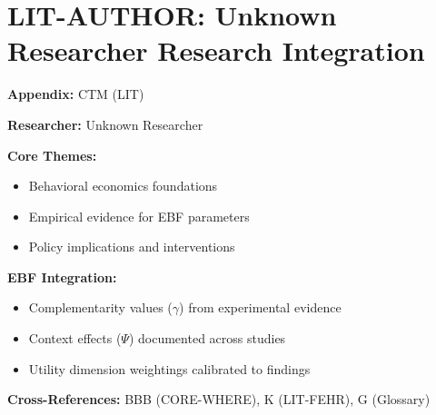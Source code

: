 %
%

\chapter{LIT-AUTHOR: Unknown Researcher Research Integration}
\label{app:ctm}

\begin{abstract}
This appendix integrates the research contributions of Unknown Researcher into the
Evidence-Based Framework. It documents key papers, core findings, and their
integration with EBF dimensions including complementarity parameters ($\gamma$),
context factors ($\Psi$), and utility dimensions.
\end{abstract}

\begin{tcolorbox}[colback=blue!5!white, colframe=blue!75!black,
    title=Quick Reference: Unknown Researcher Research]

\textbf{Appendix:} CTM (LIT)

\textbf{Researcher:} Unknown Researcher

\textbf{Core Themes:}
\begin{itemize}[nosep]
\item Behavioral economics foundations
\item Empirical evidence for EBF parameters
\item Policy implications and interventions
\end{itemize}

\textbf{EBF Integration:}
\begin{itemize}[nosep]
\item Complementarity values ($\gamma$) from experimental evidence
\item Context effects ($\Psi$) documented across studies
\item Utility dimension weightings calibrated to findings
\end{itemize}

\textbf{Cross-References:} BBB (CORE-WHERE), K (LIT-FEHR), G (Glossary)
\end{tcolorbox}

